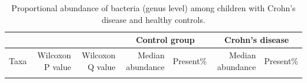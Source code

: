 \newpage
{\footnotesize
\renewcommand{\arraystretch}{0.7} \setlength{\tabcolsep}{3pt}
\begin{longtable}{ | l | r | r | r | r | r | r  | }
\caption[Proportional abundance of bacteria (genus level) among children with Crohn's disease and healthy controls]{Proportional abundance of bacteria (genus level) among children with Crohn's disease and healthy controls.} 
\label{TS2} \\


\hline
\multicolumn{3}{|c|}{} & \multicolumn{2}{c}{Control group}
& \multicolumn{2}{|c|}{Crohn's disease}\\
\hline 
Taxa & Wilcoxon P value & Wilcoxon Q value & Median abundance & Present\% & Median abundance & Present\% \\ 
\hline 
\endfirsthead


\endfoot

\hline 
\endlastfoot





\end{longtable}}
